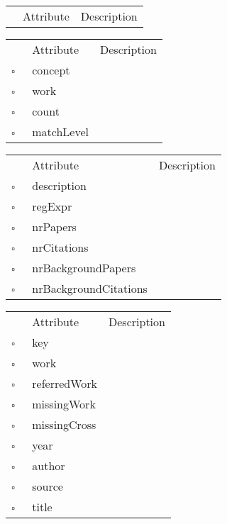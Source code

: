 \begin{table}
\caption{ConceptType  }

\begin{longtable}{llp{8cm}}
& Attribute & Description \\
\end{longtable}
\label{attr:ConceptType}
\end{table}

\begin{table}
\caption{ConceptWork  }

\begin{longtable}{llp{8cm}}
& Attribute & Description \\
$\square$\ & concept &  \\
$\square$\ & work &  \\
$\square$\ & count &  \\
$\square$\ & matchLevel &  \\
\end{longtable}
\label{attr:ConceptWork}
\end{table}

\begin{table}
\caption{ConferenceSeries  }

\begin{longtable}{llp{8cm}}
& Attribute & Description \\
$\square$\ & description &  \\
$\square$\ & regExpr &  \\
$\square$\ & nrPapers &  \\
$\square$\ & nrCitations &  \\
$\square$\ & nrBackgroundPapers &  \\
$\square$\ & nrBackgroundCitations &  \\
\end{longtable}
\label{attr:ConferenceSeries}
\end{table}

\begin{table}
\caption{CrossReference  }

\begin{longtable}{llp{8cm}}
& Attribute & Description \\
$\square$\ & key &  \\
$\square$\ & work &  \\
$\square$\ & referredWork &  \\
$\square$\ & missingWork &  \\
$\square$\ & missingCross &  \\
$\square$\ & year &  \\
$\square$\ & author &  \\
$\square$\ & source &  \\
$\square$\ & title &  \\
\end{longtable}
\label{attr:CrossReference}
\end{table}

